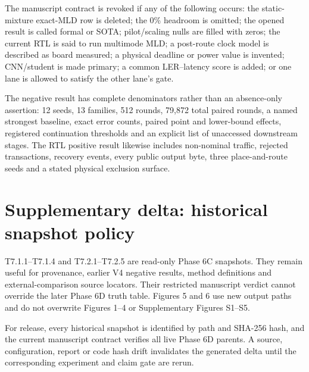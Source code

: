 \documentclass[11pt]{article}
\begin{document}
The manuscript contract is revoked if any of the following occurs: the
static-mixture exact-MLD row is deleted; the 0\% headroom is omitted; the
opened result is called formal or SOTA; pilot/scaling nulls are filled with
zeros; the current RTL is said to run multimode MLD; a post-route clock model
is described as board measured; a physical deadline or power value is
invented; CNN/student is made primary; a common LER--latency score is added; or
one lane is allowed to satisfy the other lane's gate.

The negative result has complete denominators rather than an absence-only
assertion: 12 seeds, 13 families, 512 rounds, 79,872 total paired rounds, a
named strongest baseline, exact error counts, paired point and lower-bound
effects, registered continuation thresholds and an explicit list of unaccessed
downstream stages.  The RTL positive result likewise includes non-nominal
traffic, rejected transactions, recovery events, every public output byte,
three place-and-route seeds and a stated physical exclusion surface.

\section{Supplementary delta: historical snapshot policy}

T7.1.1--T7.1.4 and T7.2.1--T7.2.5 are read-only Phase 6C snapshots.  They
remain useful for provenance, earlier V4 negative results, method definitions
and external-comparison source locators.  Their restricted manuscript verdict
cannot override the later Phase 6D truth table.  Figures 5 and 6 use new output
paths and do not overwrite Figures 1--4 or Supplementary Figures S1--S5.

For release, every historical snapshot is identified by path and SHA-256 hash,
and the current manuscript contract verifies all live Phase 6D parents.  A
source, configuration, report or code hash drift invalidates the generated
delta until the corresponding experiment and claim gate are rerun.



\end{document}
